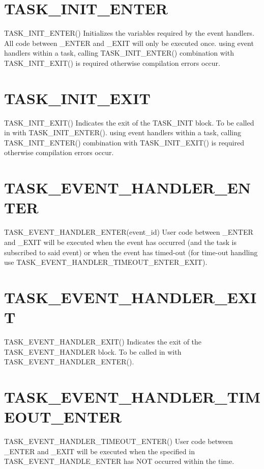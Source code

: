\section{TASK\_INIT\_ENTER}
\label{func:TASK\_INIT\_ENTER}
\begin{pdfunction}
{TASK\_INIT\_ENTER()}
{ 
Initializes the variables required by the event handlers. All 
code between \_ENTER and \_EXIT will only be executed once. 
using event handlers within a task, calling TASK\_INIT\_ENTER() 
combination with TASK\_INIT\_EXIT() is required otherwise compilation errors 
occur. }
\end{pdfunction}

\section{TASK\_INIT\_EXIT}
\label{func:TASK\_INIT\_EXIT}
\begin{pdfunction}
{TASK\_INIT\_EXIT()}
{ 
Indicates the exit of the TASK\_INIT block. To be called in 
with TASK\_INIT\_ENTER(). 
using event handlers within a task, calling TASK\_INIT\_ENTER() 
combination with TASK\_INIT\_EXIT() is required otherwise compilation errors 
occur. }
\end{pdfunction}

\section{TASK\_EVENT\_HANDLER\_ENTER}
\label{func:TASK\_EVENT\_HANDLER\_ENTER}
\begin{pdfunction}
{TASK\_EVENT\_HANDLER\_ENTER(event\_id)}
{ 
User code between \_ENTER and \_EXIT will be executed when the 
event has occurred (and the task is subscribed to said event) or 
when the event has timed-out (for time-out handling use 
TASK\_EVENT\_HANDLER\_TIMEOUT\_ENTER\_EXIT).}
\end{pdfunction}

\section{TASK\_EVENT\_HANDLER\_EXIT}
\label{func:TASK\_EVENT\_HANDLER\_EXIT}
\begin{pdfunction}
{TASK\_EVENT\_HANDLER\_EXIT()}
{ 
Indicates the exit of the TASK\_EVENT\_HANDLER block. To be called in 
with TASK\_EVENT\_HANDLER\_ENTER(). }
\end{pdfunction}

\section{TASK\_EVENT\_HANDLER\_TIMEOUT\_ENTER}
\label{func:TASK\_EVENT\_HANDLER\_TIMEOUT\_ENTER}
\begin{pdfunction}
{TASK\_EVENT\_HANDLER\_TIMEOUT\_ENTER()}
{ 
User code between \_ENTER and \_EXIT will be executed when the 
specified in TASK\_EVENT\_HANDLE\_ENTER has NOT occurred within the 
time. }
\end{pdfunction}

